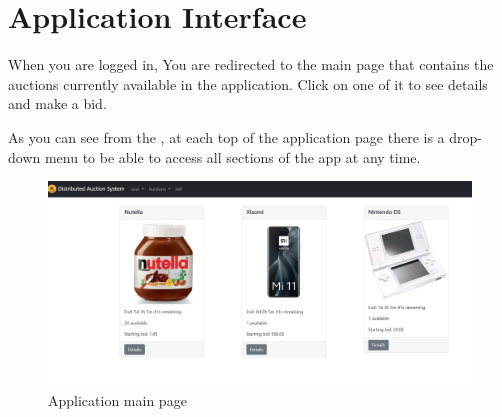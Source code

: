 \section{Application Interface}\label{sec:manualapplication}

When you are logged in, You are redirected to the main page that contains the
auctions currently available in the application. Click on one of it to see
details and make a bid.

As you can see from the , at each top of the application
page there is a drop-down menu to be able to access all sections of the app at
any time.

\begin{figure}[htb]
	\centering
	\includegraphics[width=1\textwidth]{img/main-page.jpg}
	\caption{Application main page}\label{fig:main-page}
\end{figure}




